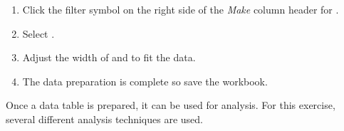 \begin{enumbox}
\begin{enumerate}
\begin{enumerate}
		\end{enumerate}
	
		\item Click the filter symbol on the right side of the \textit{Make} column header for .
		\item Select .
		\item Adjust the width of  and  to fit the data.
		\item The data preparation is complete so save the  workbook.
	
	\end{enumerate}
\end{enumbox}

Once a data table is prepared, it can be used for analysis. For this exercise, several different analysis techniques are used.

